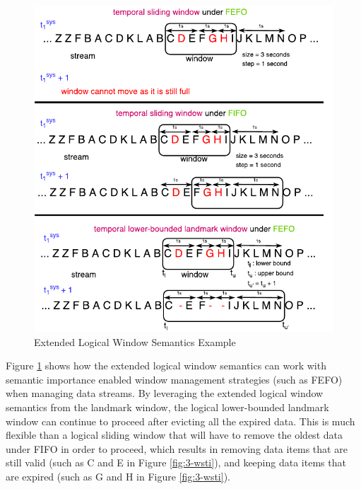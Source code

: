\begin{figure}[!htbp]
	\centering
    \includegraphics[width=5in]{img/3-psewsti.pdf}
    \caption{Extended Logical Window Semantics Example}
    \label{fig:3-psewsti}
\end{figure}

Figure \ref{fig:3-psewsti} shows how the extended logical window semantics can work with semantic importance enabled window management strategies (such as FEFO) when managing data streams. 
By leveraging the extended logical window semantics from the landmark window, the logical lower-bounded landmark window can continue to proceed after evicting all the expired data.
This is much flexible than a logical sliding window that will have to remove the oldest data under FIFO in order to proceed, which results in removing data items that are still valid (such as C and E in Figure \ref{fig:3-wsti}), and keeping data items that are expired (such as G and H in Figure \ref{fig:3-wsti}). 


